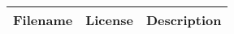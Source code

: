 \begin{center}
\begin{longtable}{|p{}|p{}|p{}|}
\hline 
Filename & License & Description\\
\hline
\hline 
\end{longtable}
\label{tabular:libraries}
\end{center}
\begin{description}
\end{description}
